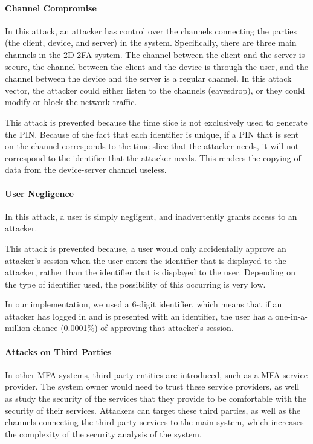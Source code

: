 \documentclass[11pt]{article}
\begin{document}

\paragraph{Channel Compromise}
In this attack, an attacker has control over the channels connecting the
parties (the client, device, and server) in the system. Specifically,
there are three main channels in the 2D-2FA system. The channel between
the client and the server is secure, the channel between the client and
the device is through the user, and the channel between the device and
the server is a regular channel. In this attack vector, the attacker
could either listen to the channels (eavesdrop), or they could modify or
block the network traffic. 

This attack is prevented because the time slice is not exclusively used
to generate the PIN. Because of the fact that each identifier is unique,
if a PIN that is sent on the channel corresponds to the time slice that
the attacker needs, it will not correspond to the identifier that the
attacker needs. This renders the copying of data from the device-server
channel useless. 


\paragraph{User Negligence}
In this attack, a user is simply negligent, and inadvertently grants
access to an attacker. 

This attack is prevented because, a user would only accidentally approve
an attacker's session when the user enters the identifier that is
displayed to the attacker, rather than the identifier that is displayed
to the user. Depending on the type of identifier used, the possibility
of this occurring is very low.

In our implementation, we used a 6-digit identifier, which means that if
an attacker has logged in and is presented with an identifier, the user
has a one-in-a-million chance (0.0001\%) of approving that attacker's
session. 

\paragraph{Attacks on Third Parties}
In other MFA systems, third party entities are introduced, such as a MFA
service provider. The system owner would need to trust these service
providers, as well as study the security of the services that they
provide to be comfortable with the security of their services. Attackers
can target these third parties, as well as the channels connecting the
third party services to the main system, which increases the complexity
of the security analysis of the system. 
\end{document}
